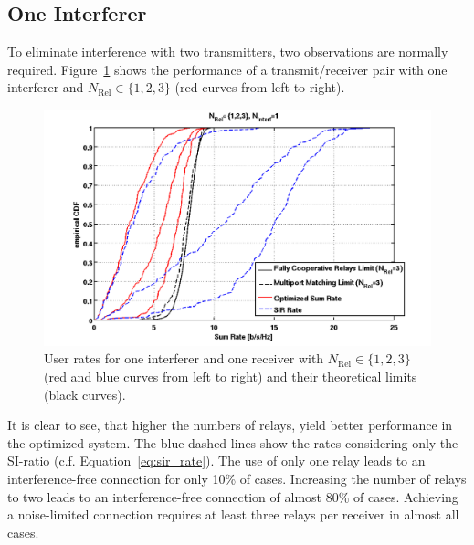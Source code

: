 \subsection{One Interferer}
\label{sec:1interf}
To eliminate interference with two transmitters, two observations are normally required.
Figure~\ref{fig:relcomp_1} shows the performance of a transmit/receiver pair with one interferer and $N_\text{Rel}\in\{1,2,3\}$ (red curves from left to right).
\begin{figure}[h]
\centering
  \includegraphics[width=0.9\linewidth]{images/Relcomparison_1interferer.png}
\caption{User rates for one interferer and one receiver with  $N_\text{Rel}\in\{1,2,3\}$ (red and blue curves from left to right) and their theoretical limits (black curves).}
\label{fig:relcomp_1}
\end{figure}
It is clear to see, that higher the numbers of relays, yield better performance in the optimized system.
The blue dashed lines show the rates considering only the SI-ratio (c.f. Equation~\eqref{eq:sir_rate}).
The use of only one relay leads to an interference-free connection for only 10\% of cases.
Increasing the number of relays to two leads to an interference-free connection of almost 80\% of cases.
Achieving a noise-limited connection requires at least three relays per receiver in almost all cases.

